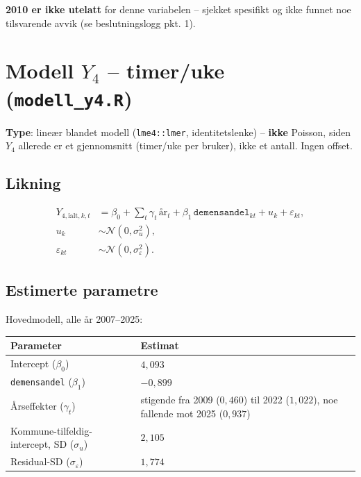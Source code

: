 \documentclass[11pt,a4paper]{article}
\begin{document}
\textbf{2010 er ikke utelatt} for denne variabelen -- sjekket spesifikt og
ikke funnet noe tilsvarende avvik (se beslutningslogg pkt. 1).

\section{Modell \(Y_4\) -- timer/uke (\texttt{modell\_y4.R})}

\textbf{Type}: lineær blandet modell (\texttt{lme4::lmer},
identitetslenke) -- \textbf{ikke} Poisson, siden \(Y_4\) allerede er et
gjennomsnitt (timer/uke per bruker), ikke et antall. Ingen offset.

\subsection*{Likning}

\begin{align}
Y_{4,\mathrm{ialt},k,t}
&=
\beta_0
+\sum_t \gamma_t\,\text{år}_t
+\beta_1\,\texttt{demensandel}_{kt}
+u_k+\varepsilon_{kt}, \\
u_k &\sim \mathcal{N}(0,\sigma_u^2), \\
\varepsilon_{kt} &\sim \mathcal{N}(0,\sigma_\varepsilon^2).
\end{align}

\subsection*{Estimerte parametre}

Hovedmodell, alle år 2007--2025:

\begin{table}[htbp]
\centering
\begin{tabularx}{0.9\textwidth}{>{\raggedright\arraybackslash}X >{\raggedright\arraybackslash}p{5.2cm}}
\toprule
\textbf{Parameter} & \textbf{Estimat} \\
\midrule
Intercept (\(\beta_0\)) & \(4{,}093\) \\
\texttt{demensandel} (\(\beta_1\)) & \(-0{,}899\) \\
Årseffekter (\(\gamma_t\)) &
stigende fra 2009 (\(0{,}460\)) til 2022 (\(1{,}022\)),
noe fallende mot 2025 (\(0{,}937\)) \\
Kommune-tilfeldig-intercept, SD (\(\sigma_u\)) & \(2{,}105\) \\
Residual-SD (\(\sigma_\varepsilon\)) & \(1{,}774\) \\
\bottomrule
\end{tabularx}
\end{table}
\end{document}
